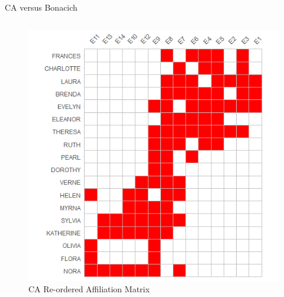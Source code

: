 \documentclass[
  ignorenonframetext,
]{beamer}
\begin{document}
\begin{frame}{CA versus Bonacich}
\protect\hypertarget{ca-versus-bonacich-6}{}
\begin{columns}[T]
\begin{column}{0.5\textwidth}
\begin{figure}

{\centering \includegraphics{Plots/ca-reord.png}

}

\caption{CA Re-ordered Affiliation Matrix}

\end{figure}
\end{column}


\end{columns}
\end{frame}
\end{document}

